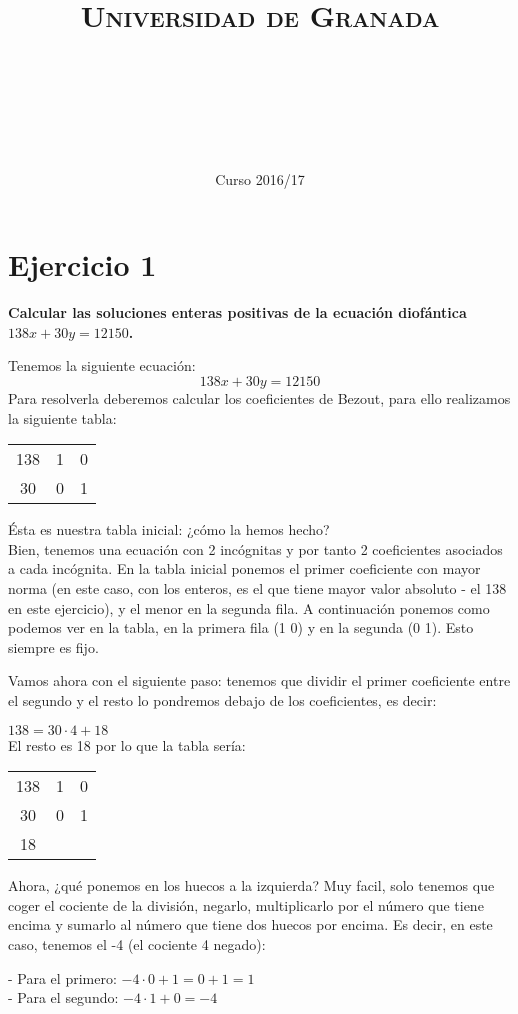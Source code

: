 \documentclass[11pt, a4paper, titlepage]{article}
\title{
  \normalfont \normalsize 
  \textsc{Universidad de Granada} \\ [25pt]    %
  \horrule{0.5pt} \\[0.4cm] %
  \huge \subject\\ %
  \horrule{2pt} \\[0.5cm] %
}
\author{\Large{\docauthor}}
\date{\vspace{-1.5em} \normalsize Curso 2016/17}
\theoremstyle{theorem-style}
\theoremstyle{definition-style}
\theoremstyle{remark-style}
\theoremstyle{example-style}
\begin{document}
\section{Ejercicio 1}

\textbf{Calcular las soluciones enteras positivas de la ecuación diofántica $ 138x + 30y = 12150 $.}

Tenemos la siguiente ecuación: $$ 138x + 30y = 12150 $$ Para resolverla deberemos calcular los coeficientes de Bezout, para ello realizamos la siguiente tabla:

\begin{center}
	\begin{tabular}{c|cc}
138 & 1 & 0 \\
30 & 0 & 1 \\
\end{tabular}

\end{center}
Ésta es nuestra tabla inicial: ¿cómo la hemos hecho? \\
Bien, tenemos una ecuación con 2 incógnitas y por tanto 2 coeficientes asociados a cada incógnita. En la tabla inicial ponemos el primer coeficiente con mayor norma (en este caso, con los enteros, es el que tiene mayor valor absoluto - el 138 en este ejercicio), y el menor en la segunda fila. A continuación ponemos como podemos ver en la tabla, en la primera fila (1 0) y en la segunda (0 1). Esto siempre es fijo.

Vamos ahora con el siguiente paso: tenemos que dividir el primer coeficiente entre el segundo y el resto lo pondremos debajo de los coeficientes, es decir:

$ 138 = 30 \cdot 4 + 18 $ \\
El resto es 18 por lo que la tabla sería:


\begin{center}
\begin{tabular}{c|cc}
138 & 1 & 0 \\
30 & 0 & 1 \\
\hline
18 \\
\end{tabular}
\end{center}

Ahora, ¿qué ponemos en los huecos a la izquierda? Muy facil, solo tenemos que coger el cociente de la división, negarlo, multiplicarlo por el número que tiene encima y sumarlo al número que tiene dos huecos por encima. Es decir, en este caso, tenemos el -4 (el cociente 4 negado):

- Para el primero: $ -4 \cdot 0 + 1 = 0 + 1 = 1 $ \\
- Para el segundo: $ -4 \cdot 1 + 0 = -4 $ \\
\end{document}
